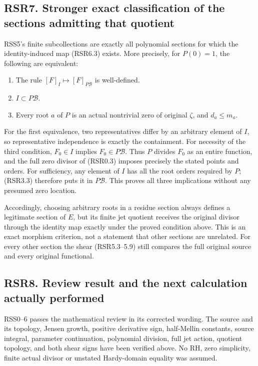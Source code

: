 \subsection{RSR7. Stronger exact classification of the sections
admitting that
quotient}\label{rsr7.-stronger-exact-classification-of-the-sections-admitting-that-quotient}

RSS5's finite subcollections are exactly all polynomial sections for
which the identity-induced map (RSR6.3) exists. More precisely, for
\(P(0)=1\), the following are equivalent:

\begin{enumerate}
\def\labelenumi{\arabic{enumi}.}
\tightlist
\item
  The rule \([F]_I\mapsto[F]_{P\mathcal B}\) is well-defined.
\item
  \(I\subset P\mathcal B\).
\item
  Every root \(a\) of \(P\) is an actual nontrivial zero of original
  \(\zeta\), and \(d_a\le m_a\).
\end{enumerate}

For the first equivalence, two representatives differ by an arbitrary
element of \(I\), so representative independence is exactly the
containment. For necessity of the third condition, \(F_0\in I\) implies
\(F_0\in P\mathcal B\). Thus \(P\) divides \(F_0\) as an entire
function, and the full zero divisor of (RSR0.3) imposes precisely the
stated points and orders. For sufficiency, any element of \(I\) has all
the root orders required by \(P\); (RSR3.3) therefore puts it in
\(P\mathcal B\). This proves all three implications without any presumed
zero location.

Accordingly, choosing arbitrary roots in a residue section always
defines a legitimate section of \(E\), but its finite jet quotient
receives the original divisor through the identity map exactly under the
proved condition above. This is an exact morphism criterion, not a
statement that other sections are unrelated. For every other section the
shear (RSR5.3--5.9) still compares the full original source and every
original functional.

\subsection{RSR8. Review result and the next calculation actually
performed}\label{rsr8.-review-result-and-the-next-calculation-actually-performed}

RSS0--6 passes the mathematical review in its corrected wording. The
source and its topology, Jensen growth, positive derivative sign,
half-Mellin constants, source integral, parameter continuation,
polynomial division, full jet action, quotient topology, and both shear
signs have been verified above. No RH, zero simplicity, finite actual
divisor or unstated Hardy-domain equality was assumed.

